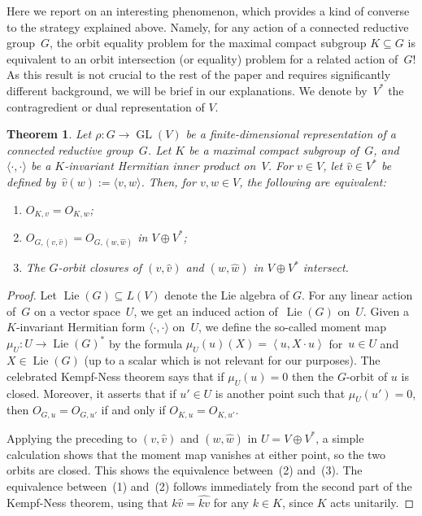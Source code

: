 \documentclass[10pt,a4paper]{article}
\DeclareMathOperator{\GL}{GL}
\DeclareMathOperator{\Lie}{Lie}
\newtheorem{theorem}{Theorem}[section]
\theoremstyle{definition}
\numberwithin{equation}{section}
\begin{document}
Here we report on an interesting phenomenon, which provides a kind of converse to the strategy explained above.
Namely, for any action of a connected reductive group~$G$, the orbit equality problem for the maximal compact subgroup $K\subseteq G$ is equivalent to an orbit intersection (or equality) problem for a related action of~$G$!
As this result is not crucial to the rest of the paper and requires significantly different background, we will be brief in our explanations.
We denote by~$V^*$ the contragredient or dual representation of $V$.

\begin{theorem}\label{thm:compacttogeneral}
Let $\rho\colon G \to \GL(V)$ be a finite-dimensional representation of a connected reductive group~$G$.
Let $K$ be a maximal compact subgroup of~$G$, and $\langle\cdot,\cdot\rangle$ be a $K$-invariant Hermitian inner product on~$V$.
For $v \in V$, let $\widehat{v} \in V^*$ be defined by~$\widehat{v}(w) := \langle v,w\rangle$.
Then, for $v,w \in V$, the following are equivalent:
\begin{enumerate}
\item $O_{K,v} = O_{K,w}$;
\item $O_{G,(v,\widehat{v})} = O_{G,(w,\widehat{w})}$ in $V \oplus V^*$;
\item The $G$-orbit closures of $(v,\widehat{v})$ and $(w,\widehat{w})$ in $V \oplus V^*$ intersect.
\end{enumerate}
\end{theorem}

\begin{proof}
Let $\Lie(G) \subseteq L(V)$ denote the Lie algebra of $G$.
For any linear action of~$G$ on a vector space~$U$, we get an induced action of~$\Lie(G)$ on~$U$.
Given a $K$-invariant Hermitian form $\langle\cdot,\cdot\rangle$ on~$U$, we define
the so-called moment map $\mu_U \colon U \rightarrow \Lie(G)^*$ by the formula $\mu_U(u)(X) = \left<u, X \cdot u\right>$ for~$u \in U$ and~$X \in \Lie(G)$ (up to a scalar which is not relevant for our purposes).
The celebrated Kempf-Ness theorem says that if $\mu_U(u) = 0$ then the $G$-orbit of $u$ is closed.
Moreover, it asserts that if $u'\in U$ is another point such that $\mu_U(u') = 0$, then $O_{G,u} = O_{G,u'}$ if and only if $O_{K,u} = O_{K,u'}$.

Applying the preceding to $(v,\widehat{v})$ and $(w,\widehat{w})$ in $U = V \oplus V^*$, a simple calculation shows that the moment map vanishes at either point, so the two orbits are closed.
This shows the equivalence between~(2) and~(3).
The equivalence between~(1) and~(2) follows immediately from the second part of the Kempf-Ness theorem, using that $k \widehat v = \widehat{k v}$ for any $k\in K$, since $K$ acts unitarily.
\end{proof}
\end{document}
